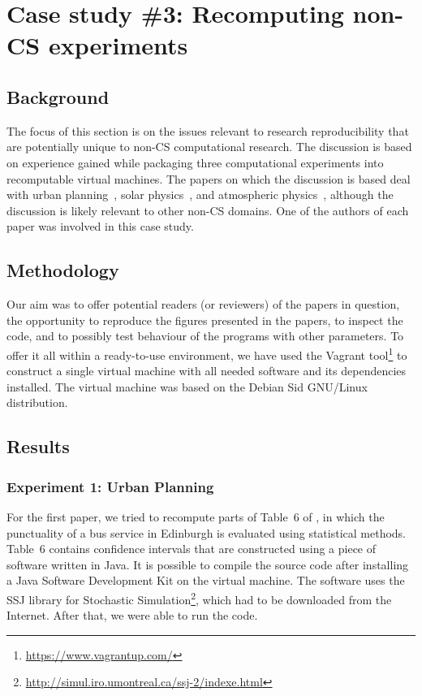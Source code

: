 \section{Case study \#3: Recomputing non-CS experiments}
\label{s:group3}

\subsection{Background}

The focus of this section is on the issues relevant to research reproducibility that are potentially 
  unique to non-CS computational research.
The discussion is based on experience gained while packaging three computational experiments 
  into recomputable virtual machines.
The papers on which the discussion is based 
  deal with urban planning~\cite{danielpaper}, solar
  physics~\cite{bareford2010nanoflare}, and atmospheric
  physics~\cite{arabas2013libcloud},
  although the discussion is likely relevant to other non-CS domains. One of the
  authors of each paper was involved in this case study.

\subsection{Methodology}

Our aim was to offer potential readers (or reviewers) of the papers in question, 
  the opportunity to reproduce the figures presented in the papers, 
  to inspect the code, and to possibly test behaviour of the programs with other parameters.
To offer it all within a ready-to-use environment, we have used the Vagrant
tool\footnote{\url{https://www.vagrantup.com/}}
to
  construct a single virtual machine with all needed software and its dependencies installed.
The virtual machine was based on the Debian Sid GNU/Linux distribution.

\subsection{Results}
\subsubsection*{Experiment 1: Urban Planning}

For the first paper, we tried to recompute parts of Table~6 of
\cite{danielpaper}, in which the punctuality of a bus service in Edinburgh is
evaluated using statistical methods. Table~6 contains confidence intervals that
are constructed using a piece of software written in Java. It is possible to
compile the source code after installing a Java Software Development Kit on the
virtual machine. The software uses the SSJ library for Stochastic
Simulation\footnote{\url{http://simul.iro.umontreal.ca/ssj-2/indexe.html}},
which had to be downloaded from the Internet. After that, we were able to run
the code.

